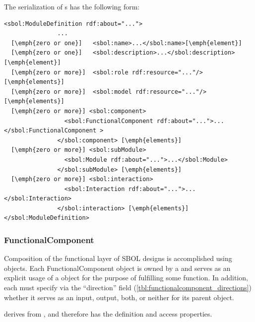 The serialization of s has the following form:
\begin{lstlisting}
<sbol:ModuleDefinition rdf:about="...">
               ...
  [\emph{zero or one}]   <sbol:name>...</sbol:name>[\emph{element}]
  [\emph{zero or one}]   <sbol:description>...</sbol:description>[\emph{element}]
  [\emph{zero or more}]  <sbol:role rdf:resource="..."/>[\emph{elements}]
  [\emph{zero or more}]  <sbol:model rdf:resource="..."/>[\emph{elements}]
  [\emph{zero or more}] <sbol:component>
                 <sbol:FunctionalComponent rdf:about="...">...</sbol:FunctionalComponent >
               </sbol:component> [\emph{elements}]
  [\emph{zero or more}] <sbol:subModule>
                 <sbol:Module rdf:about="...">...</sbol:Module>
               </sbol:subModule> [\emph{elements}]
  [\emph{zero or more}] <sbol:interaction>
                 <sbol:Interaction rdf:about="...">...</sbol:Interaction>
               </sbol:interaction> [\emph{elements}]
</sbol:ModuleDefinition>
\end{lstlisting}



\subsubsection{FunctionalComponent}
\label{sec:FunctionalComponent}
Composition of the functional layer of SBOL designs is accomplished using  objects. Each FunctionalComponent object is owned by a  and serves as an explicit usage of a  object for the purpose of fulfilling some function. In addition, each  must specify via the ``direction'' field (\ref{tbl:functionalcomponent_directions}) whether it serves as an  input, output, both, or neither for its parent  object. 


 derives from , and therefore has the definition and access properties. 


